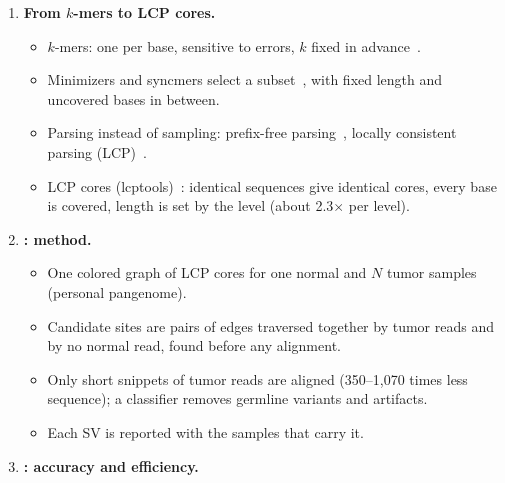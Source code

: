 {\begin{enumerate}
\begin{itemize}
  \item All of these callers first align every read to a reference, which is expensive~\cite{Alser_2020} (more than 4 h for HCC1954 on 16 threads).
  \item Reference bias: the reference is not the patient's genome, and germline differences are reported as somatic SVs~\cite{Ballouz_2019,Qin_2025}.
  \item Pangenome graphs~\cite{Liao_2023,Garrison_2018} and donor-specific assemblies~\cite{hifiasm} help~\cite{Qin_2025,refbias}, but miss private variants or add cost.
  \item Reference-free comparison of samples: de Bruijn graphs~\cite{Pevzner_2001,debruijn}, colored de Bruijn graphs~\cite{cortex}, novoBreak on short reads~\cite{novobreak}. A colored graph of one patient's samples is a personal pangenome.
  \end{itemize}
\item \textbf{From $k$-mers to LCP cores.}
  \begin{itemize}
  \item $k$-mers: one per base, sensitive to errors, $k$ fixed in advance~\cite{Chikhi_2013}.
  \item Minimizers and syncmers select a subset~\cite{roberts,syncmers,rustmdbg}, with fixed length and uncovered bases in between.
  \item Parsing instead of sampling: prefix-free parsing~\cite{pfp}, locally consistent parsing (LCP)~\cite{sv94a,sv94b}.
  \item LCP cores (lcptools)~\cite{lcpan,gencore}: identical sequences give identical cores, every base is covered, length is set by the level (about 2.3$\times$ per level).
  \end{itemize}
\item \textbf{\tool: method.}
  \begin{itemize}
  \item One colored graph of LCP cores for one normal and $N$ tumor samples (personal pangenome).
  \item Candidate sites are pairs of edges traversed together by tumor reads and by no normal read, found before any alignment.
  \item Only short snippets of tumor reads are aligned (350--1,070 times less sequence); a classifier removes germline variants and artifacts.
  \item Each SV is reported with the samples that carry it.
  \end{itemize}
\item \textbf{\tool: accuracy and efficiency.}

\end{enumerate}}
